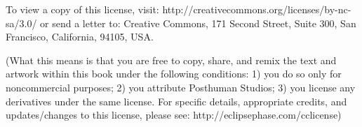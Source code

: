 To view a copy of this license, visit:
http://creativecommons.org/licenses/by-nc-sa/3.0/ or send a letter to:
Creative Commons, 171 Second Street, Suite 300, San Francisco,
California, 94105, USA.

(What this means is that you are free to copy, share, and remix the
text and artwork within this book under the following conditions: 1)
you do so only for noncommercial purposes; 2) you attribute Posthuman
Studios; 3) you license any derivatives under the same license. For
specific details, appropriate credits, and updates/changes to this
license, please see: http://eclipsephase.com/cclicense)

